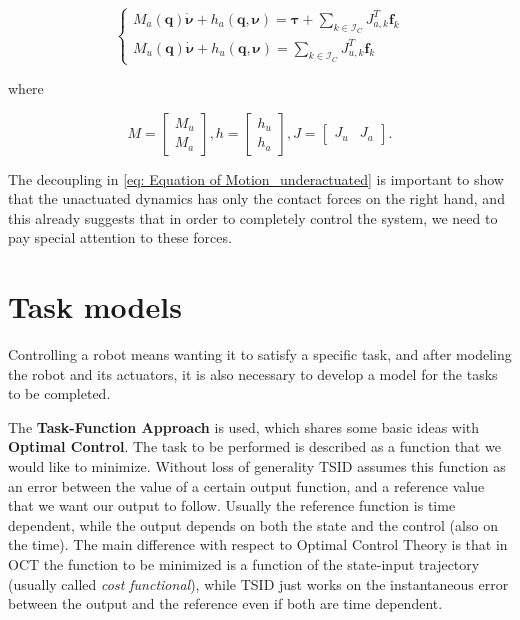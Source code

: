     \begin{equation}
         \begin{cases}
          M_a(\mathbf{q})\dot{\bm{\nu}} + h_a(\mathbf{q}, \bm{\nu}) = \bm{\tau} + \sum_{k \in \mathcal{I}_C} J^{T}_{a,k}\mathbf{f}_{k} 
          \\
          M_u(\mathbf{q})\dot{\bm{\nu}} + h_u(\mathbf{q}, \bm{\nu}) = \sum_{k \in \mathcal{I}_C} J^{T}_{u,k}\mathbf{f}_{k}
         \end{cases} 
         \label{eq: Equation of Motion_underactuated}
    \end{equation}

    where 
    
   \begin{equation*}
       M = \begin{bmatrix}
    M_u \\
    M_a
\end{bmatrix}, h = \begin{bmatrix}
    h_u \\
    h_a
\end{bmatrix}, J = \begin{bmatrix}
    J_u & J_a
\end{bmatrix}.
   \end{equation*}

The decoupling in \eqref{eq: Equation of Motion_underactuated} is important to show that the unactuated dynamics has only the contact forces on the right hand, and this already suggests that in order to completely control the system, we need to pay special attention to these forces.

\section{Task models}
\label{sec:Task models}

Controlling a robot means wanting it to satisfy a specific task, and after modeling the robot and its actuators, it is also necessary to develop a model for the tasks to be completed.

The \textbf{Task-Function Approach} is used, which shares some basic ideas with \textbf{Optimal Control}.
The task to be performed is described as a function that we would like to minimize.
Without loss of generality TSID assumes this function as an error between the value of a certain output function, and a reference value that we want our output to follow.
Usually the reference function is time dependent, while the output depends on both the state and the control (also on the time).
The main difference with respect to Optimal Control Theory is that in OCT the function to be minimized is a function of the state-input trajectory (usually called \textit{cost functional}), while TSID just works on the instantaneous error between the output and the reference even if both are time dependent.

